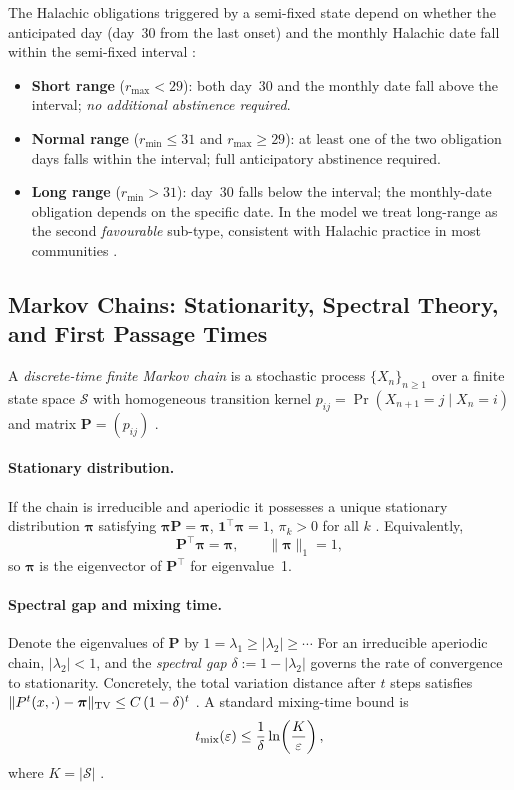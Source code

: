 \documentclass[12pt,a4paper]{article}
\newcommand{\piv}{\boldsymbol{\pi}}
\newcommand{\mat}[1]{\mathbf{#1}}
\begin{document}
The Halachic obligations triggered by a semi-fixed state depend on whether the
anticipated day (day~30 from the last onset) and the monthly Halachic date fall
within the semi-fixed interval \citep{NishmatAvraham}:
\begin{itemize}
  \item \textbf{Short range} ($r_{\max} < 29$): both day~30 and the monthly
        date fall above the interval; \emph{no additional abstinence required}.
  \item \textbf{Normal range} ($r_{\min} \le 31$ and $r_{\max} \ge 29$):
        at least one of the two obligation days falls within the interval;
        full anticipatory abstinence required.
  \item \textbf{Long range} ($r_{\min} > 31$): day~30 falls below the interval;
        the monthly-date obligation depends on the specific date.
        In the model we treat long-range as the second \emph{favourable} sub-type,
        consistent with Halachic practice in most communities \citep{NishmatAvraham}.
\end{itemize}

\subsection{Markov Chains: Stationarity, Spectral Theory, and First Passage Times}
\label{sec:mc-background}

A \emph{discrete-time finite Markov chain} is a stochastic process
$\{X_n\}_{n \ge 1}$ over a finite state space $\mathcal{S}$ with homogeneous
transition kernel $p_{ij} = \Pr(X_{n+1}=j \mid X_n=i)$ and matrix
$\mat{P} = (p_{ij})$ \citep{Norris1997}.

\paragraph{Stationary distribution.}
If the chain is irreducible and aperiodic it possesses a unique stationary
distribution $\piv$ satisfying $\piv\mat{P} = \piv$, $\mathbf{1}^\top\piv = 1$,
$\pi_k > 0$ for all $k$ \citep{KemenySnell1960}. Equivalently,
\begin{equation}\label{eq:stationary}
  \mat{P}^\top\piv = \piv, \qquad \|\piv\|_1 = 1,
\end{equation}
so $\piv$ is the eigenvector of $\mat{P}^\top$ for eigenvalue~1.

\paragraph{Spectral gap and mixing time.}
Denote the eigenvalues of $\mat{P}$ by $1 = \lambda_1 \ge |\lambda_2| \ge \cdots$
For an irreducible aperiodic chain, $|\lambda_2| < 1$, and the
\emph{spectral gap} $\delta := 1 - |\lambda_2|$ governs the rate of convergence
to stationarity.  Concretely, the total variation distance after $t$ steps
satisfies $\|P^t(x,\cdot) - \piv\|_{\rm TV} \le C\,(1-\delta)^t$ \citep{Bremaud1999}.
A standard mixing-time bound is
\begin{equation}\label{eq:mixing}
  t_{\rm mix}(\varepsilon) \le \frac{1}{\delta}\ln\!\left(\frac{K}{\varepsilon}\right),
\end{equation}
where $K = |\mathcal{S}|$ \citep{Norris1997}.
\end{document}
